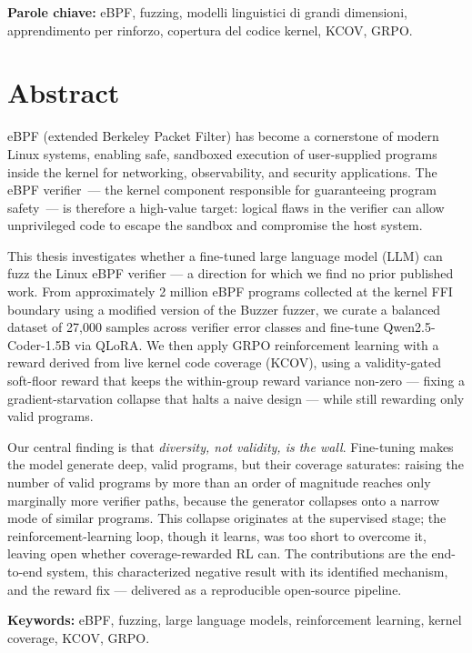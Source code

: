 \bigskip
\noindent\textbf{Parole chiave:} eBPF, fuzzing, modelli linguistici di grandi dimensioni,
apprendimento per rinforzo, copertura del codice kernel, KCOV, GRPO.

\cleardoublepage

\chapter*{Abstract}

eBPF (extended Berkeley Packet Filter) has become a cornerstone of modern Linux
systems, enabling safe, sandboxed execution of user-supplied programs inside the
kernel for networking, observability, and security applications.
The eBPF verifier~--- the kernel component responsible for guaranteeing program
safety~--- is therefore a high-value target: logical flaws in the verifier can
allow unprivileged code to escape the sandbox and compromise the host system.

This thesis investigates whether a fine-tuned large language model (LLM) can fuzz
the Linux eBPF verifier --- a direction for which we find no prior published work.
From approximately 2 million eBPF programs collected at the kernel FFI boundary
using a modified version of the Buzzer fuzzer, we curate a balanced dataset of
27,000 samples across verifier error classes and fine-tune Qwen2.5-Coder-1.5B via
QLoRA. We then apply GRPO reinforcement learning with a reward derived from live
kernel code coverage (KCOV), using a validity-gated soft-floor reward that keeps
the within-group reward variance non-zero --- fixing a gradient-starvation
collapse that halts a naive design --- while still rewarding only valid programs.

Our central finding is that \emph{diversity, not validity, is the wall}.
Fine-tuning makes the model generate deep, valid programs, but their coverage
saturates: raising the number of valid programs by more than an order of magnitude
reaches only marginally more verifier paths, because the generator collapses onto a
narrow mode of similar programs. This collapse originates at the supervised stage;
the reinforcement-learning loop, though it learns, was too short to overcome it,
leaving open whether coverage-rewarded RL can. The contributions are the end-to-end
system, this characterized negative result with its identified mechanism, and the
reward fix --- delivered as a reproducible open-source pipeline.

\bigskip
\noindent\textbf{Keywords:} eBPF, fuzzing, large language models, reinforcement learning,
kernel coverage, KCOV, GRPO.
